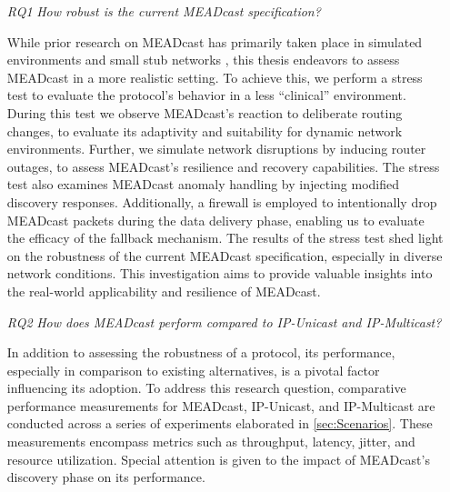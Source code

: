 \begin{itemize}
    \item[\textit{RQ1}]
        \textit{How robust is the current MEADcast specification?}\par
        While prior research on MEADcast has primarily taken place in simulated
            environments \cite{meadcast1, meadcast2} and small stub networks
            \cite{sdn_ba}, this thesis endeavors to assess MEADcast in a more
            realistic setting.
        To achieve this, we perform a stress test to evaluate the protocol's
            behavior in a less ``clinical'' environment.
        During this test we observe MEADcast's reaction to deliberate routing
            changes, to evaluate its adaptivity and suitability for dynamic
            network environments.
        Further, we simulate network disruptions by inducing router outages, to
            assess MEADcast's resilience and recovery capabilities.
        The stress test also examines MEADcast anomaly handling by injecting
            modified discovery responses.
        Additionally, a firewall is employed to intentionally drop MEADcast
            packets during the data delivery phase, enabling us to evaluate the
            efficacy of the fallback mechanism.
        The results of the stress test shed light on the robustness of the
            current MEADcast specification, especially in diverse network
            conditions.
        This investigation aims to provide valuable insights into the
            real-world applicability and resilience of MEADcast.
    \item[\textit{RQ2}]
        \textit{How does MEADcast perform compared to IP-Unicast and
        IP-Multicast?}\par
        In addition to assessing the robustness of a protocol, its performance,
            especially in comparison to existing alternatives, is a pivotal
            factor influencing its adoption.
        To address this research question, comparative performance measurements
            for MEADcast, IP-Unicast, and IP-Multicast are conducted across a
            series of experiments elaborated in \autoref{sec:Scenarios}.
        These measurements encompass metrics such as throughput, latency,
            jitter, and resource utilization.
        Special attention is given to the impact of MEADcast's discovery phase
            on its performance.

\end{itemize}
